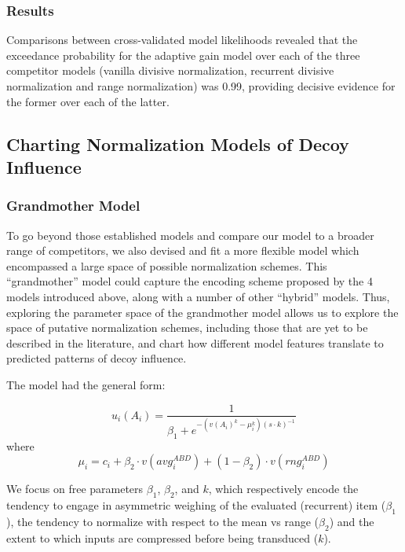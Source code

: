 \documentclass[a4paper, nobind]{templates/ociamthesis}
\begin{document}
\hypertarget{results-1}{%
\subsubsection{Results}\label{results-1}}

Comparisons between cross-validated model likelihoods revealed that the exceedance probability for the adaptive gain model over each of the three competitor models (vanilla divisive normalization, recurrent divisive normalization and range normalization) was 0.99, providing decisive evidence for the former over each of the latter.

\hypertarget{charting-normalization-models-of-decoy-influence}{%
\subsection{Charting Normalization Models of Decoy Influence}\label{charting-normalization-models-of-decoy-influence}}

\hypertarget{grandmother-model}{%
\subsubsection{Grandmother Model}\label{grandmother-model}}

To go beyond those established models and compare our model to a broader range of competitors, we also devised and fit a more flexible model which encompassed a large space of possible normalization schemes. This ``grandmother'' model could capture the encoding scheme proposed by the 4 models introduced above, along with a number of other ``hybrid'' models. Thus, exploring the parameter space of the grandmother model allows us to explore the space of putative normalization schemes, including those that are yet to be described in the literature, and chart how different model features translate to predicted patterns of decoy influence.

The model had the general form:

\begin{equation}
u_i(A_i) = \frac{1}{\beta_1 + e^{-(v(A_i)^k - \mu_i^k)(s \cdot k)^{-1}}}
\label{eq:grandmother}
\end{equation}
where
\begin{equation}
\mu_i = c_i+ \beta_2  \cdot v(avg^{ABD}_i)+(1-\beta_2)\cdot v(rng^{ABD}_i)
\end{equation}

We focus on free parameters \(\beta_1\), \(\beta_2\), and \(k\), which respectively encode the tendency to engage in asymmetric weighing of the evaluated (recurrent) item (\(\beta_1\)), the tendency to normalize with respect to the mean vs range (\(\beta_2\)) and the extent to which inputs are compressed before being transduced (\(k\)).
\end{document}
